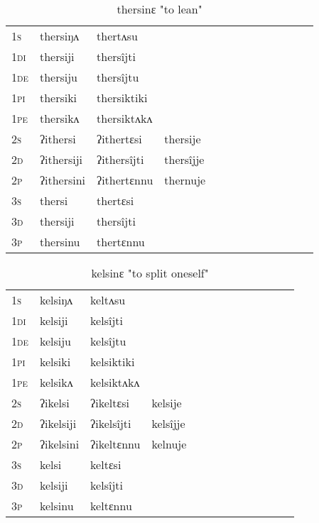 \documentclass[oldfontcommands,oneside,a4paper,11pt]{article}
\begin{document}
\begin{table}[H]
\label{er.vr} \centering 
\caption{thersinɛ  "to lean"  }
\begin{tabular}{l|l|l|l|l|l|l|l|l|l|l|l|l}  \toprule
\textsc{1s} &thersiŋʌ &thertʌsu \\ 
\textsc{1di} &thersiji &thersîjti   \\
\textsc{1de} &thersiju &thersîjtu   \\ 
\textsc{1pi} &thersiki &thersiktiki   \\ 
\textsc{1pe} &thersikʌ &thersiktʌkʌ   \\ 
\textsc{2s} & ʔithersi & ʔithertɛsi &thersije  \\ 
\textsc{2d} & ʔithersiji & ʔithersîjti &thersîjje    \\
\textsc{2p} & ʔithersini  & ʔithertɛnnu &thernuje  \\ 
\textsc{3s} & thersi & thertɛsi   \\ 
\textsc{3d} & thersiji & thersîjti   \\ 
\textsc{3p} & thersinu  & thertɛnnu \\ 
\bottomrule
\end{tabular}
\end{table}


\begin{table}[H]
\label{el.vr} \centering 
\caption{kelsinɛ  "to split oneself"  }
\begin{tabular}{l|l|l|l|l|l|l|l|l|l|l|l|l}  \toprule
\textsc{1s} &kelsiŋʌ &keltʌsu \\ 
\textsc{1di} &kelsiji &kelsîjti   \\
\textsc{1de} &kelsiju &kelsîjtu   \\ 
\textsc{1pi} &kelsiki &kelsiktiki   \\ 
\textsc{1pe} &kelsikʌ &kelsiktʌkʌ   \\ 
\textsc{2s} & ʔikelsi & ʔikeltɛsi &kelsije  \\ 
\textsc{2d} & ʔikelsiji & ʔikelsîjti &kelsîjje    \\
\textsc{2p} & ʔikelsini  & ʔikeltɛnnu &kelnuje  \\ 
\textsc{3s} & kelsi & keltɛsi   \\ 
\textsc{3d} & kelsiji & kelsîjti   \\ 
\textsc{3p} & kelsinu  & keltɛnnu \\ 
\bottomrule
\end{tabular}
\end{table}
\end{document}
